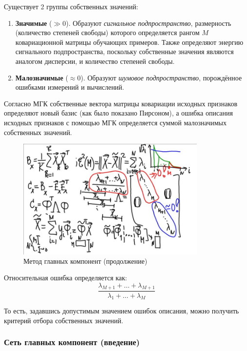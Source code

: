 \documentclass[a4paper]{article}
\numberwithin{equation}{subsection}
\begin{document}
Существует 2 группы собственных значений: 

\begin{enumerate}
    \item \textbf{Значимые} ($\gg0$). Образуют \textit{сигнальное подпространство},
        размерность (количество степеней свободы) которого определяется рангом $M$ 
        ковариационной матрицы обучающих примеров.
        Также определяют энергию сигнального подпространства, поскольку собственные значения 
        являются аналогом дисперсии, и количество степеней свободы.
    \item \textbf{Малозначимые} ($\approx 0$). Образуют \textit{шумовое подпространство},
        порождённое ошибками измерений и вычислений.
\end{enumerate}

Согласно МГК собственные вектора матрицы ковариации исходных признаков определяют новый
базис (как было показано Пирсоном), а ошибка описания исходных признаков с помощью МГК
определяется суммой малозначимых собственных значений.

\begin{figure}[htbp]
    \centering
    \includegraphics[height=6cm]{hyperflat_12__1.jpeg}
    \caption{Метод главных компонент (продолжение)}
    \label{hyperflat_12__1}
\end{figure}

Относительная ошибка определяется как:
\begin{equation}
    \dfrac{\lambda_{M+1}+\dots+\lambda_{M+1}}{\lambda_1+\dots+\lambda_M}
\end{equation}

То есть, задавшись допустимым значением ошибок описания, можно получить критерий отбора
собственных значений.




\subsubsection{Сеть главных компонент (введение)}
\end{document}
